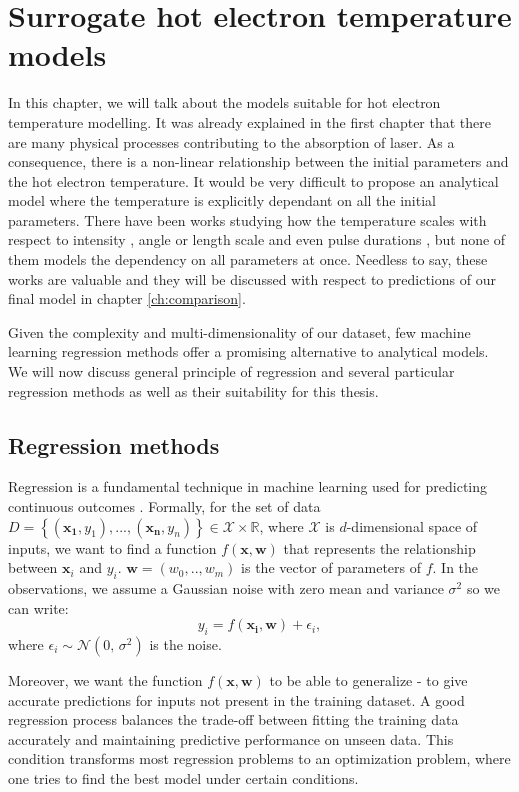 \chapter{Surrogate hot electron temperature models}
In this chapter, we will talk about the models suitable for hot electron temperature modelling. It was already explained in the first chapter that there are many physical processes contributing to the absorption of laser. As a consequence, there is a non-linear relationship between the initial parameters and the hot electron temperature. It would be very difficult to propose an analytical model where the temperature is explicitly dependant on all the initial parameters. There have been works studying how the temperature scales with respect to intensity \cite{kluge2011,cui2013,miller2023,haines2009,beg1997}, angle \cite{cui2013} or length scale and even pulse durations \cite{miller2023}, but none of them models the dependency on all parameters at once. Needless to say, these works are valuable and they will be discussed with respect to predictions of our final model in chapter \ref{ch:comparison}.

Given the complexity and multi-dimensionality of our dataset, few machine learning regression methods offer a promising alternative to analytical models. We will now discuss general principle of regression and several particular regression methods as well as their suitability for this thesis.

\section{Regression methods}
Regression is a fundamental technique in machine learning used for predicting continuous outcomes \cite{bishop2006}. Formally, for the set of data $D = \left\{(\bm{x_1},y_1),...,(\bm{x_n},y_n)\right\}\in \mathcal{X}\times\mathbb{R}$, where $\mathcal{X}$ is $d$-dimensional space of inputs, we want to find a function $f(\bm{x},\bm{w})$ that represents the relationship between $\bm{x}_i$ and $y_i$. $\bm{w} = (w_0,..,w_{m})$ is the vector of parameters of $f$. In the observations, we assume a Gaussian noise with zero mean and variance $\sigma^2$ so we can write:
\begin{equation}
	y_i = f(\bm{x_i},\bm{w}) + \epsilon_i,
\end{equation}
where $\epsilon_i \sim \mathcal{N}(0,\,\sigma^{2})$ is the noise.

Moreover, we want the function $f(\bm{x},\bm{w})$ to be able to generalize - to give accurate predictions for inputs not present in the training dataset. A good regression process balances the trade-off between fitting the training data accurately and maintaining predictive performance on unseen data. This condition transforms most regression problems to an optimization problem, where one tries to find the best model under certain conditions.

